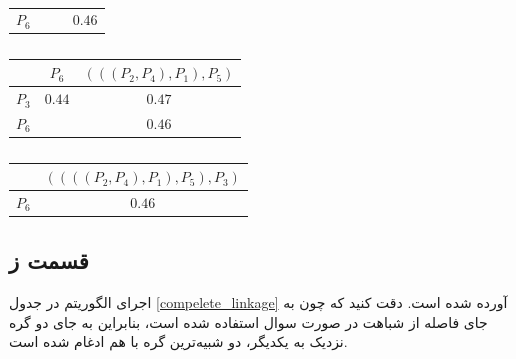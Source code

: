 \documentclass[12pt, a4paper]{article}
\begin{document}
\begin{latin}
\begin{table}[h]
\begin{subtable}{0.45\linewidth}
\begin{tabular}{c|c|c|c}
            \hline
            $P_6$ &        &        & $0.46$\\
        \end{tabular}
    \end{subtable}
    \hfill
    \begin{subtable}{0.45\linewidth}
        \caption{}
        \begin{tabular}{c|c|c}
                  & $P_6$  & $(((P_2, P_4), P_1), P_5)$\\
            \hline
            $P_3$ & $0.44$ & \cellcolor{purple!30} $0.47$\\
            \hline
            $P_6$ &        & $0.46$\\
        \end{tabular}
    \end{subtable}
    \newline
    \begin{subtable}{0.45\linewidth}
    \caption{}
    \begin{tabular}{c|c}
              & $((((P_2, P_4), P_1), P_5), P_3)$\\
        \hline
        $P_6$ & \cellcolor{purple!30} $0.46$\\
    \end{tabular}
\end{subtable}
\end{table}
\end{latin}

\clearpage

\subsection*{قسمت ز}

اجرای الگوریتم  در جدول \ref{compelete_linkage} آورده شده است. دقت کنید که
چون به جای فاصله از شباهت در صورت سوال استفاده شده است، بنابراین به جای دو گره نزدیک
به یکدیگر، دو شبیه‌ترین گره با هم ادغام شده است.
\end{document}
